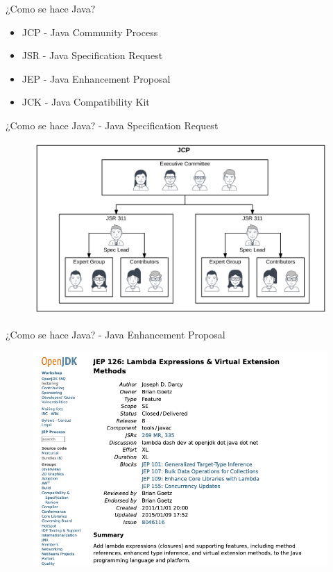 \documentclass[aspectratio=169]{beamer}
\begin{document}
\begin{frame}[fragile]{¿Como se hace Java?}
	\begin{itemize}
		\item JCP - Java Community Process
		\item JSR - Java Specification Request
		\item JEP - Java Enhancement Proposal
		\item JCK - Java Compatibility Kit
	\end{itemize}	
\end{frame}


\begin{frame}[fragile]{¿Como se hace Java? - Java Specification Request}
	\begin{figure}
		\centering
		\includegraphics[width=0.9\linewidth]{Images/jcpjsr}
	\end{figure}

\end{frame}

\begin{frame}[fragile]{¿Como se hace Java? - Java Enhancement Proposal}
	\begin{figure}
		\centering
		\includegraphics[width=0.9\linewidth]{Images/jep}
	\end{figure}
	
\end{frame}
\end{document}
